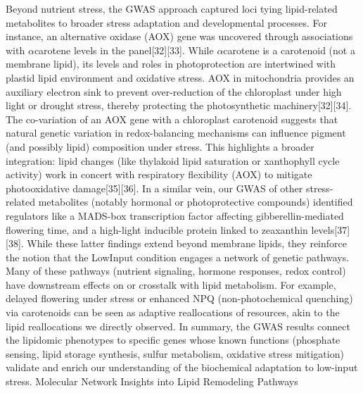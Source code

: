 \documentclass[10pt,letterpaper]{article}
\begin{document}
\begin{itemize}
Beyond nutrient stress, the GWAS approach captured loci tying lipid-related metabolites to broader stress adaptation and developmental processes. For instance, an alternative oxidase (AOX) gene was uncovered through associations with $\alpha$\-carotene levels in the panel[32][33]. While $\alpha$\-carotene is a carotenoid (not a membrane lipid), its levels and roles in photoprotection are intertwined with plastid lipid environment and oxidative stress. AOX in mitochondria provides an auxiliary electron sink to prevent over-reduction of the chloroplast under high light or drought stress, thereby protecting the photosynthetic machinery[32][34]. The co-variation of an AOX gene with a chloroplast carotenoid suggests that natural genetic variation in redox-balancing mechanisms can influence pigment (and possibly lipid) composition under stress. This highlights a broader integration: lipid changes (like thylakoid lipid saturation or xanthophyll cycle activity) work in concert with respiratory flexibility (AOX) to mitigate photooxidative damage[35][36]. In a similar vein, our GWAS of other stress-related metabolites (notably hormonal or photoprotective compounds) identified regulators like a MADS-box transcription factor affecting gibberellin-mediated flowering time, and a high-light inducible protein linked to zeaxanthin levels[37][38]. While these latter findings extend beyond membrane lipids, they reinforce the notion that the LowInput condition engages a network of genetic pathways. Many of these pathways (nutrient signaling, hormone responses, redox control) have downstream effects on or crosstalk with lipid metabolism. For example, delayed flowering under stress or enhanced NPQ (non-photochemical quenching) via carotenoids can be seen as adaptive reallocations of resources, akin to the lipid reallocations we directly observed. In summary, the GWAS results connect the lipidomic phenotypes to specific genes whose known functions (phosphate sensing, lipid storage synthesis, sulfur metabolism, oxidative stress mitigation) validate and enrich our understanding of the biochemical adaptation to low-input stress.
Molecular Network Insights into Lipid Remodeling Pathways

\end{itemize}
\end{document}
